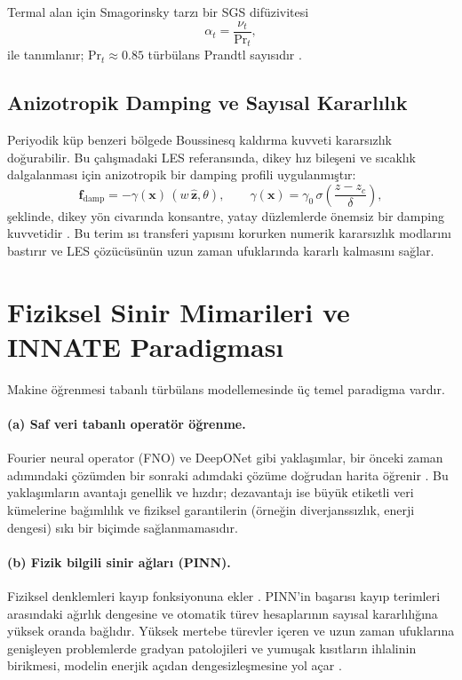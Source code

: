 Termal alan için Smagorinsky tarzı bir SGS difüzivitesi
\begin{equation}
\alpha_{t} = \frac{\nu_{t}}{\mathrm{Pr}_{t}},
\label{eq:turbulent_prandtl}
\end{equation}
ile tanımlanır; $\mathrm{Pr}_{t}\approx 0.85$ türbülans Prandtl sayısıdır \cite{kays_turbulent_prandtl_1994}.

\subsection{Anizotropik Damping ve Sayısal Kararlılık}

Periyodik küp benzeri bölgede Boussinesq kaldırma kuvveti kararsızlık doğurabilir. Bu çalışmadaki LES referansında, dikey hız bileşeni ve sıcaklık dalgalanması için anizotropik bir damping profili uygulanmıştır:
\begin{equation}
\mathbf{f}_{\mathrm{damp}} = -\gamma(\mathbf{x})\,(w\,\hat{\mathbf{z}}, \theta),
\qquad
\gamma(\mathbf{x}) = \gamma_{0}\,\sigma\!\left(\frac{z-z_{c}}{\delta}\right),
\label{eq:anisotropic_damping}
\end{equation}
şeklinde, dikey yön civarında konsantre, yatay düzlemlerde önemsiz bir damping kuvvetidir \cite{calzavarini_damping_2014}. Bu terim ısı transferi yapısını korurken numerik kararsızlık modlarını bastırır ve LES çözücüsünün uzun zaman ufuklarında kararlı kalmasını sağlar.

\section{Fiziksel Sinir Mimarileri ve INNATE Paradigması}

Makine öğrenmesi tabanlı türbülans modellemesinde üç temel paradigma vardır.

\paragraph{(a) Saf veri tabanlı operatör öğrenme.} Fourier neural operator (FNO) ve DeepONet gibi yaklaşımlar, bir önceki zaman adımındaki çözümden bir sonraki adımdaki çözüme doğrudan harita öğrenir \cite{li_fno_2021, lu_deeponet_2021}. Bu yaklaşımların avantajı genellik ve hızdır; dezavantajı ise büyük etiketli veri kümelerine bağımlılık ve fiziksel garantilerin (örneğin diverjanssızlık, enerji dengesi) sıkı bir biçimde sağlanmamasıdır.

\paragraph{(b) Fizik bilgili sinir ağları (PINN).} Fiziksel denklemleri kayıp fonksiyonuna ekler \cite{raissi_pinn_2019}. PINN'in başarısı kayıp terimleri arasındaki ağırlık dengesine ve otomatik türev hesaplarının sayısal kararlılığına yüksek oranda bağlıdır. Yüksek mertebe türevler içeren ve uzun zaman ufuklarına genişleyen problemlerde gradyan patolojileri ve yumuşak kısıtların ihlalinin birikmesi, modelin enerjik açıdan dengesizleşmesine yol açar \cite{krishnapriyan_failure_2021, wang_gradient_2021}.

